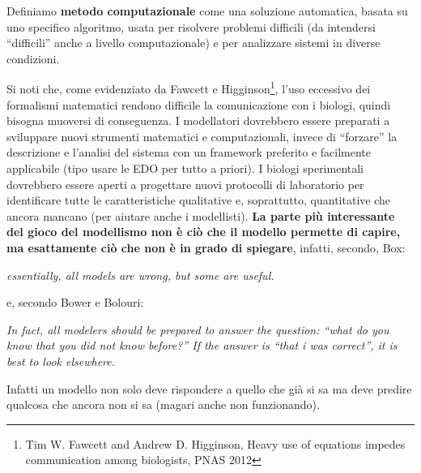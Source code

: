 \documentclass[a4paper,12pt, oneside]{book}
\begin{document}
\begin{definizione}
  Definiamo \textbf{metodo computazionale} come una soluzione automatica, basata
  su uno specifico algoritmo, usata per risolvere problemi difficili (da
  intendersi ``difficili'' anche a livello computazionale) e per
  analizzare sistemi in diverse condizioni.
\end{definizione}
Si noti che, come evidenziato da Fawcett e Higginson\footnote{Tim W. Fawcett
  and Andrew D. Higginson, Heavy use of equations impedes communication among
  biologists, PNAS 2012}, l'uso eccessivo dei formalismi matematici rendono
difficile la comunicazione con i biologi, quindi bisogna muoversi di
conseguenza. I modellatori dovrebbero essere preparati a sviluppare nuovi
strumenti matematici e computazionali, invece di ``forzare'' la descrizione e
l'analisi del sistema con un framework preferito e facilmente applicabile (tipo
usare le EDO per tutto a priori). I  biologi sperimentali dovrebbero essere aperti
a progettare nuovi protocolli di laboratorio per identificare tutte le
caratteristiche qualitative e, soprattutto, quantitative che ancora mancano (per
aiutare anche i modellisti). \textbf{La parte più interessante del gioco del
  modellismo non è ciò che il modello permette di capire, ma esattamente ciò che
  non è in grado di spiegare}, infatti, secondo, Box:
\begin{center}
  \textit{essentially, all models are wrong, but some are useful.}
\end{center}
e, secondo Bower e Bolouri:
\begin{center}
  \textit{In fact, all modelers should be prepared to answer the question:
    ``what do you know that you did not know before?'' If the answer is ``that i
    was correct'', it is best to look elsewhere.}
\end{center}
Infatti un modello non solo deve rispondere a quello che già si sa ma deve
predire qualcosa che ancora non si sa (magari anche non funzionando).
\end{document}
